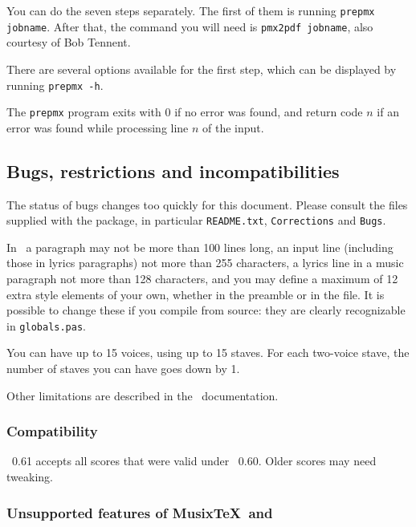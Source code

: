 \documentclass[11pt]{article}
\begin{document}
You can do the seven steps separately. The first of them is running
\verb`prepmx jobname`. After that, the command you will need is
\verb`pmx2pdf jobname`, also courtesy of Bob Tennent.

There are several options available for the first step, which can be 
displayed by running \verb`prepmx -h`.

The \texttt{prepmx} program exits with  0 if no error was 
found, and return code $n$ if an error was found while processing line $n$ of 
the input. 
 
\subsection{Bugs, restrictions and incompatibilities} \label{limits}

The status of bugs changes too quickly for this document.  Please 
consult the files supplied with the package, in particular 
\texttt{README.txt}, \texttt{Corrections} and \texttt{Bugs}.

In \MTx\current\ a paragraph may not be more than 100 lines long, 
an input line (including those in lyrics paragraphs) not more than 
255 characters, a lyrics line in a music paragraph not more than 
128 characters, and you may define a maximum of 12 extra style 
elements of your own, whether in the preamble or in the 
 file.  It is possible to change these if you compile
from source: they are clearly recognizable in \texttt{globals.pas}.

 You can have up to 15 voices, using up to 15
staves.  For each two-voice stave, the number of staves you can have goes
down by 1. 

Other limitations are described in the \PMX\ documentation. 

\subsubsection{Compatibility}

\MTx\ 0.61 accepts all scores that were valid under \MTx\ 0.60.
Older scores may need tweaking.

\subsubsection{Unsupported features of Musix\TeX\ and \PMX}
\end{document}
